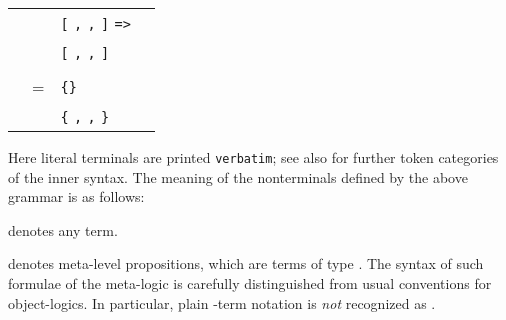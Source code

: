 \begin{isabellebody}
\begin{isamarkuptext}
\begin{center}
\begin{supertabular}{rclr}
    & \isa{{\isachardoublequote}{\isacharbar}{\isachardoublequote}} & \verb|[|  \verb|,| \isa{{\isachardoublequote}{\isasymdots}{\isachardoublequote}} \verb|,|  \verb|]| \verb|=>|  &  \\
    & \isa{{\isachardoublequote}{\isacharbar}{\isachardoublequote}} & \verb|[|  \verb|,| \isa{{\isachardoublequote}{\isasymdots}{\isachardoublequote}} \verb|,|  \verb|]| \isa{{\isachardoublequote}{\isasymRightarrow}{\isachardoublequote}}  &  \\\\

  \hypertarget{syntax.inner.sort}{\hyperlink{syntax.inner.sort}{\mbox{}}} & = & \verb|{}| \\
    & \isa{{\isachardoublequote}{\isacharbar}{\isachardoublequote}} & \verb|{|  \verb|,| \isa{{\isachardoublequote}{\isasymdots}{\isachardoublequote}} \verb|,|  \verb|}| \\
  \end{supertabular}
  \end{center}

  \medskip Here literal terminals are printed \verb|verbatim|;
  see also  for further token categories of the
  inner syntax.  The meaning of the nonterminals defined by the above
  grammar is as follows:

  \begin{description}

  \item {}\hyperlink{syntax.inner.any}{\mbox{}} denotes any term.

  \item {}\hyperlink{syntax.inner.prop}{\mbox{}} denotes meta-level propositions,
  which are terms of type .  The syntax of such formulae of
  the meta-logic is carefully distinguished from usual conventions for
  object-logics.  In particular, plain \isa{{\isachardoublequote}{\isasymlambda}{\isachardoublequote}}-term notation is
  \emph{not} recognized as \hyperlink{syntax.inner.prop}{\mbox{}}.


\end{description}
\end{isamarkuptext}
\end{isabellebody}
